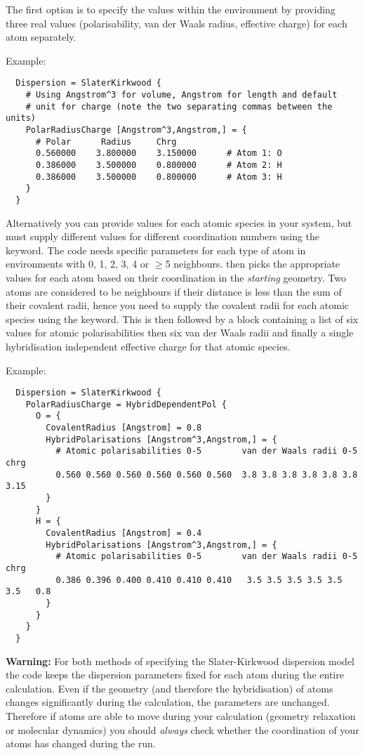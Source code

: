 The first option is to specify the values within the
 environment by providing three real values
(polarisability, van der Waals radius, effective charge) for each atom
separately.

Example:\invparskip
\begin{verbatim}
  Dispersion = SlaterKirkwood {
    # Using Angstrom^3 for volume, Angstrom for length and default
    # unit for charge (note the two separating commas between the units)
    PolarRadiusCharge [Angstrom^3,Angstrom,] = {
      # Polar      Radius     Chrg
      0.560000    3.800000    3.150000      # Atom 1: O
      0.386000    3.500000    0.800000      # Atom 2: H
      0.386000    3.500000    0.800000      # Atom 3: H
    }
  }
\end{verbatim}

Alternatively you can provide values for each atomic species in your
system, but must supply different values for different coordination
numbers using the  keyword. The code needs
specific parameters for each type of atom in environments with 0, 1,
2, 3, 4 or $\geqslant$5 neighbours. \dftbp{} then picks the
appropriate values for each atom based on their coordination in the
\emph{starting} geometry.  Two atoms are considered to be neighbours
if their distance is less than the sum of their covalent radii, hence
you need to supply the covalent radii for each atomic species using
the  keyword. This is then followed by a
 block containing a list of six values for
atomic polarisabilities then six van der Waals radii and finally a
single hybridisation independent effective charge for that atomic
species.

Example:\invparskip
\begin{verbatim}
  Dispersion = SlaterKirkwood {
    PolarRadiusCharge = HybridDependentPol {
      O = {
        CovalentRadius [Angstrom] = 0.8
        HybridPolarisations [Angstrom^3,Angstrom,] = {
          # Atomic polarisabilities 0-5        van der Waals radii 0-5  chrg
          0.560 0.560 0.560 0.560 0.560 0.560  3.8 3.8 3.8 3.8 3.8 3.8  3.15
        }
      }
      H = {
        CovalentRadius [Angstrom] = 0.4
        HybridPolarisations [Angstrom^3,Angstrom,] = {
          # Atomic polarisabilities 0-5        van der Waals radii 0-5  chrg
          0.386 0.396 0.400 0.410 0.410 0.410   3.5 3.5 3.5 3.5 3.5 3.5   0.8
        }
      }
    }
  }
\end{verbatim}

\textbf{Warning:} For both methods of specifying the Slater-Kirkwood dispersion model the code keeps
the dispersion parameters fixed for each atom during the entire calculation. Even if the geometry
(and therefore the hybridisation) of atoms changes significantly during the calculation, the
parameters are unchanged. Therefore if atoms are able to move during your calculation (geometry
relaxation or molecular dynamics) you should \emph{always} check whether the coordination of your
atoms has changed during the run.

